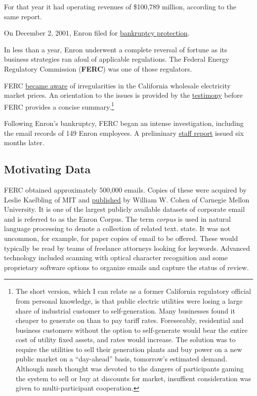 \documentclass[]{article}
\let\rmarkdownfootnote\footnote%
\def\footnote{\protect\rmarkdownfootnote}
\begin{document}
For that year it had operating revenues of \$100,789 million, according
to the same report.

On December 2, 2001, Enron filed for
\href{https://www.sec.gov/Archives/edgar/data/1024401/000102440101500046/ene8-k1214.txt}{bankruptcy
protection}.

In less than a year, Enron underwent a complete reversal of fortune as
its business strategies ran afoul of applicable regulations. The Federal
Energy Regulatory Commission (\textbf{FERC}) was one of those
regulators.

FERC
\href{https://www.ferc.gov/industries/electric/indus-act/wec/chron/chronology.pdf}{became
aware} of irregularities in the California wholesale electricity market
prices. An orientation to the issues is provided by the
\href{https://web.stanford.edu/group/fwolak/cgi-bin/sites/default/files/files/2002,\%20May\%2015_Senate\%20Committee\%20on\%20Commerce,\%20Science\%20and\%20Transportation_Wolak.pdf}{testimony}
before FERC provides a concise summary.\footnote{The short version,
  which I can relate as a former California regulatory official from
  personal knowledge, is that public electric utilities were losing a
  large share of industrial customer to self-generation. Many businesses
  found it cheaper to generate on than to pay tariff rates. Foreseeably,
  residential and business customers without the option to self-generate
  would bear the entire cost of utility fixed assets, and rates would
  increase. The solution was to require the utilities to sell their
  generation plants and buy power on a new public market on a
  ``day-ahead'' basis, tomorrow's estimated demand. Although much
  thought was devoted to the dangers of participants gaming the system
  to sell or buy at discounts for market, insuffient consideration was
  given to multi-participant cooperation.}

Following Enron's bankruptcy, FERC began an intense investigation,
including the email records of 149 Enron employees. A preliminary
\href{http://elibrary.ferc.gov/idmws/common/opennat.asp?fileID=9548231}{staff
report} issued six months later.

\hypertarget{motivating-data}{%
\subsection{Motivating Data}\label{motivating-data}}

FERC obtained approximately 500,000 emails. Copies of these were
acquired by Leslie Kaelbling of MIT and
\href{https://www.cs.cmu.edu/~./enron/}{published} by William W. Cohen
of Carnegie Mellon University. It is one of the largest publicly
available datasets of corporate email and is referred to as the Enron
Corpus. The term \emph{corpus} is used in natural language processing to
denote a collection of related text. state. It was not uncommon, for
example, for paper copies of email to be offered. These would typically
be read by teams of freelance attorneys looking for keywords. Advanced
technology included scanning with optical character recognition and some
proprietary software options to organize emails and capture the status
of review.
\end{document}
